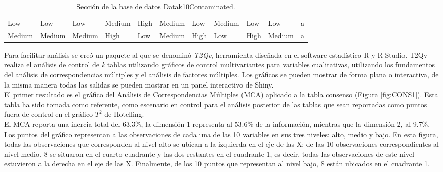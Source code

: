 \documentclass[water,article,submit,moreauthors,pdftex]{mdpi}
\begin{document}
\begin{table}[]
{\begin{tabular}{@{}lllllllllll@{}}
Low  & Low    & Low  & Medium & High & Medium & Low    & Medium & Low    & Low    & a                         \\
Medium                       & Medium                         & Medium                       & High                           & Low                          & Medium                         & High                           & Low                            & High                           & Medium                         & a \\ \bottomrule
\end{tabular}
}

\caption{Sección de la base de datos Datak10Contaminated.}

\label{tab:tabladatos}

\end{table}

Para facilitar análisis se creó un paquete al que se denominó
\emph{T2Qv}, herramienta diseñada en el software estadístico R y R
Studio. T2Qv realiza el análisis de control de \emph{k} tablas
utilizando gráficos de control multivariantes para variables
cualitativas, utilizando los fundamentos del análisis de
correspondencias múltiples y el análisis de factores múltiples. Los
gráficos se pueden mostrar de forma plana o interactiva, de la misma
manera todas las salidas se pueden mostrar en un panel interactivo de
Shiny.\\
El primer resultado es el gráfico del Análisis de Correspondencias
Múltiples (MCA) aplicado a la tabla consenso (Figura \ref{fig:CONS1}).
Esta tabla ha sido tomada como referente, como escenario en control para
el análisis posterior de las tablas que sean reportadas como puntos
fuera de control en el gráfico \(T^2\) de Hotelling.\\
El MCA reporta una inercia total del 63.3\%, la dimensión 1 representa
al 53.6\% de la información, mientras que la dimensión 2, al 9.7\%. Los
puntos del gráfico representan a las observaciones de cada una de las 10
variables en sus tres niveles: alto, medio y bajo. En esta figura, todas
las observaciones que corresponden al nivel alto se ubican a la
izquierda en el eje de las X; de las 10 observaciones correspondientes
al nivel medio, 8 se situaron en el cuarto cuadrante y las dos restantes
en el cuadrante 1, es decir, todas las observaciones de este nivel
estuvieron a la derecha en el eje de las X. Finalmente, de los 10 puntos
que representan al nivel bajo, 8 están ubicados en el cuadrante 1.
\end{document}
